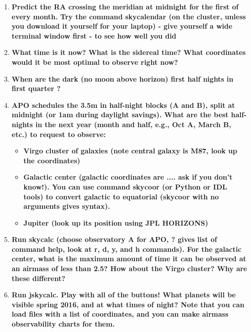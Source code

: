 \documentclass[12pt]{article}
\begin{document}
\begin{enumerate}[1.]
    \item \textbf{Predict the RA crossing the meridian at midnight for the
    first of every month. Try the command skycalendar (on the cluster,
    unless you download it yourself for your laptop) - give yourself a
    wide terminal window first - to see how well you did}

    \item \textbf{What time is it now? What is the sidereal time? What
    coordinates would it be most optimal to observe right now?}

    \item \textbf{When are the dark (no moon above horizon) first half
    nights in first quarter ? }

    \item \textbf{APO schedules the 3.5m in half-night blocks (A and
    B), split at midnight (or 1am during daylight savings). What are
    the best half-nights in the next year (month and half, e.g., Oct
    A, March B, etc.) to request to observe:}
        \begin{itemize}
            \item \textbf{Virgo cluster of galaxies (note central
            galaxy is M87, look up the coordinates)}
            \item \textbf{Galactic center (galactic coordinates are
            .... ask if you don't know!). You can use command skycoor
            (or Python or IDL tools) to convert galactic to equatorial
            (skycoor with no arguments gives syntax). }
            \item \textbf{Jupiter (look up its position using JPL
            HORIZONS) }
        \end{itemize}

    \item \textbf{Run skycalc (choose observatory A for APO, ? gives
    list of command help, look at r, d, y, and h commands). For the
    galactic center, what is the maximum amount of time it can be
    observed at an airmass of less than 2.5? How about the Virgo
    cluster? Why are these different?}

    \item \textbf{Run jskycalc. Play with all of the buttons! What
    planets will be visible spring 2016, and at what times of night?
    Note that you can load files with a list of coordinates, and you
    can make airmass observability charts for them.}


\end{enumerate}
\end{document}
